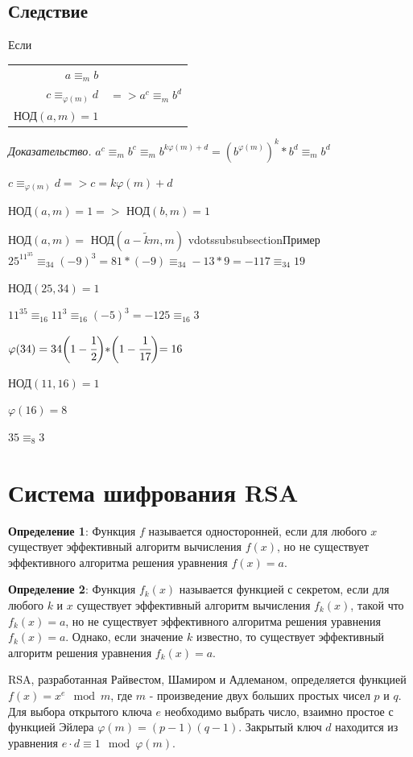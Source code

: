 \documentclass[12pt]{article}
\begin{document}
\subsection{Следствие}
Если
\begin{table}[h!]
    \begin{tabular}{r|c}
        $a\equiv_{m}b$                                     \\
        $c\equiv_{\varphi(m)}d$ & $=>a^{c}\equiv_{m}b^{d}$ \\
        НОД$(a,m)=1$
    \end{tabular}
\end{table}
\par \textit{Доказательство.} $a^{c}\equiv_{m}b^{c}\equiv_{m}b^{k\varphi(m)+d}=(b^{\varphi(m)})^{k}*b^{d}\equiv_{m}b^{d}$
\par $c\equiv_{\varphi(m)}d=>c=k\varphi(m)+d$
\par НОД$(a,m)=1=>$ НОД$(b,m)=1$
\par НОД$(a,m)=$ НОД$(a-\widetilde{k}m,m)$
vdotssubsubsection{Пример}
$25^{11^{35}}\equiv_{34}(-9)^{3}=81*(-9)\equiv_{34}-13*9=-117\equiv_{34}19$
\par НОД$(25,34)=1$
\par $11^{35}\equiv_{16}11^{3}\equiv_{16}(-5)^{3}=-125\equiv_{16}3$
\par $\varphi(34)=34\biggl(1-\cfrac{1}{2}\biggl)*\biggl(1-\cfrac{1}{17}\biggl)=16$
\par НОД$(11,16)=1$
\par $\varphi(16)=8$
\par $35\equiv_{8}3$

\section{Система шифрования RSA}

\textbf{Определение 1}: Функция $f$ называется односторонней, если для любого $x$ существует эффективный алгоритм вычисления $f(x)$, но не существует эффективного алгоритма решения уравнения $f(x) = a$.

\textbf{Определение 2}: Функция $f_k(x)$ называется функцией с секретом, если для любого $k$ и $x$ существует эффективный алгоритм вычисления $f_k(x)$, такой что $f_k(x) = a$, но не существует эффективного алгоритма решения уравнения $f_k(x) = a$. Однако, если значение $k$ известно, то существует эффективный алгоритм решения уравнения $f_k(x) = a$.

RSA, разработанная Райвестом, Шамиром и Адлеманом, определяется функцией $f(x) = x^e \mod m$, где $m$ - произведение двух больших простых чисел $p$ и $q$. Для выбора открытого ключа $e$ необходимо выбрать число, взаимно простое с функцией Эйлера $\varphi(m) = (p-1)(q-1)$. Закрытый ключ $d$ находится из уравнения $e \cdot d \equiv 1 \mod \varphi(m)$.
\end{document}
